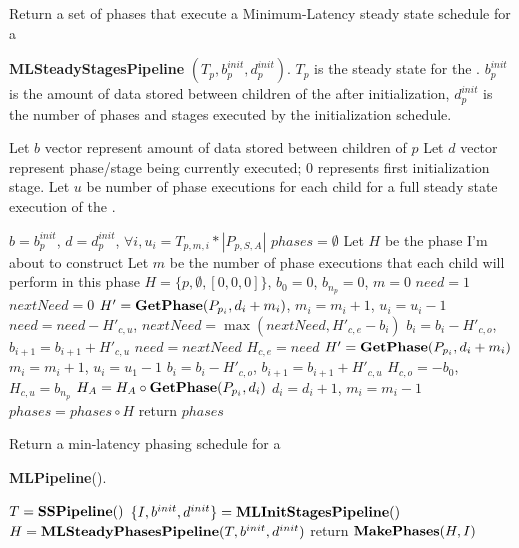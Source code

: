 \begin{algorithm}
\label{alg:min-lat-steady-pipeline} \caption{Return a set of
phases that execute a Minimum-Latency steady state schedule for a
{\pipeline}} {\bf MLSteadyStagesPipeline} $(T_p, b^{init}_p,
d^{init}_p)$. $T_p$ is the steady state for the {\pipeline}.
$b^{init}_p$ is the amount of data stored between children of the
{\pipeline} after initialization, $d^{init}_p$ is the number of
phases and stages executed by the initialization schedule.
\begin{algorithmic}
\STATE Let $b$ vector represent amount of data stored between children of
$p$
\STATE Let $d$ vector represent phase/stage being currently executed; 0
represents first initialization stage.
\STATE Let $u$ be number of phase executions for each child for a full steady state execution of the {\pipeline}.

\STATE $b = b^{init}_p$, $d = d^{init}_p$, $\forall i, u_i = T_{p, m, i} * |P_{p, S, A}|$
\STATE $phases = \emptyset$
\STATE Let $H$ be the phase I'm about to construct
\STATE Let $m$ be the number of phase executions that each child
will perform in this phase
\STATE $H = \{p, \emptyset, [0,0,0]\}$, $b_0 = 0$, $b_{n_p} = 0$, $m = 0$
\STATE $need = 1$
\STATE $nextNeed = 0$
\STATE $H' = {\bf GetPhase}(P_{p_i}, d_i + m_i)$, $m_i = m_i + 1$, $u_i = u_i - 1$
\STATE $need = need - H'_{c, u}$, $nextNeed = \max(nextNeed, H'_{c, e} - b_i)$
\STATE $b_i = b_i - H'_{c, o}$, $b_{i+1} = b_{i+1} + H'_{c, u}$
\ENDWHILE
\STATE $need = nextNeed$
\ENDFOR
\STATE $H_{c,e} = need$
\STATE $H' = {\bf GetPhase}(P_{p_i}, d_i + m_i)$
\STATE $m_i = m_i + 1$, $u_i = u_1 - 1$
\STATE $b_i = b_i - H'_{c, o}$, $b_{i+1} = b_{i+1} + H'_{c, u}$
\ELSE
{}
\ENDIF
\ENDWHILE
\ENDFOR
\STATE $H_{c,o} = -b_0$, $H_{c,u} = b_{n_p}$
\STATE $H_A = H_A \circ {\bf GetPhase}(P_{p_i}, d_i)$
\STATE $d_i = d_i + 1$, $m_i = m_i - 1$
\ENDWHILE
\ENDFOR
\STATE $phases = phases \circ H$
\ENDWHILE
\STATE return $phases$
\end{algorithmic}
\end{algorithm}

\begin{algorithm}
\label{alg:min-lat-pipeline} \caption{Return a min-latency phasing
schedule for a {\pipeline}} {\bf MLPipeline}().
\begin{algorithmic}
\STATE $T = {\bf SSPipeline} ()$
\STATE $\{I, b^{init}, d^{init}\} = {\bf MLInitStagesPipeline}()$
\STATE $H = {\bf MLSteadyPhasesPipeline}(T, b^{init}, d^{init})$
\STATE return ${\bf MakePhases} (H, I)$
\end{algorithmic}
\end{algorithm}

